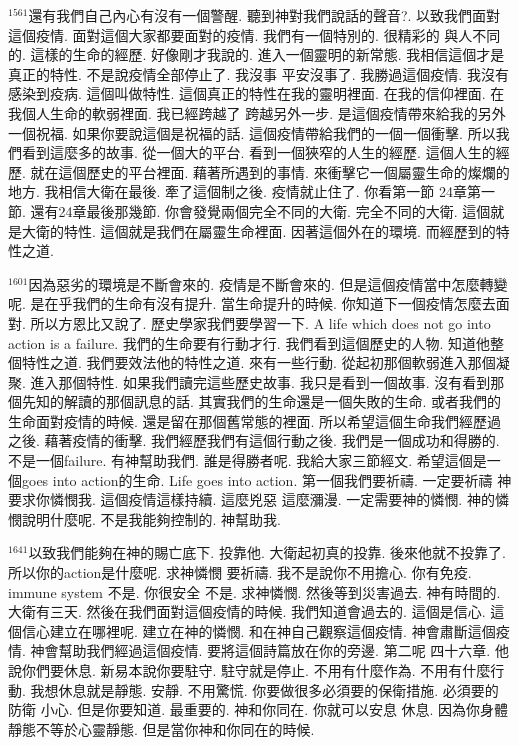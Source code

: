 \documentclass{book}
\begin{document}
$^{1561}$還有我們自己內心有沒有一個警醒.
聽到神對我們說話的聲音?.
以致我們面對這個疫情.
面對這個大家都要面對的疫情.
我們有一個特別的.
很精彩的 與人不同的.
這樣的生命的經歷.
好像剛才我說的.
進入一個靈明的新常態.
我相信這個才是真正的特性.
不是說疫情全部停止了.
我沒事 平安沒事了.
我勝過這個疫情.
我沒有感染到疫病.
這個叫做特性.
這個真正的特性在我的靈明裡面.
在我的信仰裡面.
在我個人生命的軟弱裡面.
我已經跨越了 跨越另外一步.
是這個疫情帶來給我的另外一個祝福.
如果你要說這個是祝福的話.
這個疫情帶給我們的一個一個衝擊.
所以我們看到這麼多的故事.
從一個大的平台.
看到一個狹窄的人生的經歷.
這個人生的經歷.
就在這個歷史的平台裡面.
藉著所遇到的事情.
來衝擊它一個屬靈生命的燦爛的地方.
我相信大衛在最後.
牽了這個制之後.
疫情就止住了.
你看第一節 24章第一節.
還有24章最後那幾節.
你會發覺兩個完全不同的大衛.
完全不同的大衛.
這個就是大衛的特性.
這個就是我們在屬靈生命裡面.
因著這個外在的環境.
而經歷到的特性之道.

$^{1601}$因為惡劣的環境是不斷會來的.
疫情是不斷會來的.
但是這個疫情當中怎麼轉變呢.
是在乎我們的生命有沒有提升.
當生命提升的時候.
你知道下一個疫情怎麼去面對.
所以方恩比又說了.
歷史學家我們要學習一下.
A life which does not go into action is a failure.
我們的生命要有行動才行.
我們看到這個歷史的人物.
知道他整個特性之道.
我們要效法他的特性之道.
來有一些行動.
從起初那個軟弱進入那個凝聚.
進入那個特性.
如果我們讀完這些歷史故事.
我只是看到一個故事.
沒有看到那個先知的解讀的那個訊息的話.
其實我們的生命還是一個失敗的生命.
或者我們的生命面對疫情的時候.
還是留在那個舊常態的裡面.
所以希望這個生命我們經歷過之後.
藉著疫情的衝擊.
我們經歷我們有這個行動之後.
我們是一個成功和得勝的.
不是一個failure.
有神幫助我們.
誰是得勝者呢.
我給大家三節經文.
希望這個是一個goes into action的生命.
Life goes into action.
第一個我們要祈禱.
一定要祈禱 神要求你憐憫我.
這個疫情這樣持續.
這麼兇惡 這麼瀰漫.
一定需要神的憐憫.
神的憐憫說明什麼呢.
不是我能夠控制的.
神幫助我.

$^{1641}$以致我們能夠在神的賜亡底下.
投靠他.
大衛起初真的投靠.
後來他就不投靠了.
所以你的action是什麼呢.
求神憐憫 要祈禱.
我不是說你不用擔心.
你有免疫.
immune system 不是.
你很安全 不是.
求神憐憫.
然後等到災害過去.
神有時間的.
大衛有三天.
然後在我們面對這個疫情的時候.
我們知道會過去的.
這個是信心.
這個信心建立在哪裡呢.
建立在神的憐憫.
和在神自己觀察這個疫情.
神會肅斷這個疫情.
神會幫助我們經過這個疫情.
要將這個詩篇放在你的旁邊.
第二呢 四十六章.
他說你們要休息.
新易本說你要駐守.
駐守就是停止.
不用有什麼作為.
不用有什麼行動.
我想休息就是靜態.
安靜.
不用驚慌.
你要做很多必須要的保衛措施.
必須要的防衛 小心.
但是你要知道.
最重要的.
神和你同在.
你就可以安息 休息.
因為你身體靜態不等於心靈靜態.
但是當你神和你同在的時候.
\end{document}
